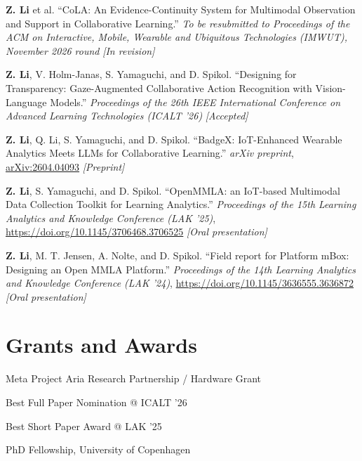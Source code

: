 \documentclass[11pt,letterpaper]{report}
\begin{document}
    \begin{tablist}
        \item[2026] \tab{} \textbf{Z. Li} et al. \enquote{CoLA: An Evidence-Continuity System for Multimodal Observation and Support in Collaborative Learning.} \textit{To be resubmitted to Proceedings of the ACM on Interactive, Mobile, Wearable and Ubiquitous Technologies (IMWUT), November 2026 round} \textit{[In revision]}
        \item[2026] \tab{} \textbf{Z. Li}, V. Holm-Janas, S. Yamaguchi, and D. Spikol. \enquote{Designing for Transparency: Gaze-Augmented Collaborative Action Recognition with Vision-Language Models.} \textit{Proceedings of the 26th IEEE International Conference on Advanced Learning Technologies (ICALT '26)} \textit{[Accepted]}
        \item[2026] \tab{} \textbf{Z. Li}, Q. Li, S. Yamaguchi, and D. Spikol. \enquote{BadgeX: IoT-Enhanced Wearable Analytics Meets LLMs for Collaborative Learning.} \textit{arXiv preprint}, \href{https://arxiv.org/abs/2604.04093}{arXiv:2604.04093} \textit{[Preprint]}
        \item[2025] \tab{} \textbf{Z. Li}, S. Yamaguchi, and D. Spikol. \enquote{OpenMMLA: an IoT-based Multimodal Data Collection Toolkit for Learning Analytics.} \textit{Proceedings of the 15th Learning Analytics and Knowledge Conference (LAK '25)}, \href{https://doi.org/10.1145/3706468.3706525}{https://doi.org/10.1145/3706468.3706525} \textit{[Oral presentation]}
        \item[2024] \tab{} \textbf{Z. Li}, M. T. Jensen, A. Nolte, and D. Spikol. \enquote{Field report for Platform mBox: Designing an Open MMLA Platform.} \textit{Proceedings of the 14th Learning Analytics and Knowledge Conference (LAK '24)}, \href{https://doi.org/10.1145/3636555.3636872}{https://doi.org/10.1145/3636555.3636872} \textit{[Oral presentation]}
    \end{tablist}


    \section*{Grants and Awards}

    \begin{tablist}
        \item[2026\phantom{--2027}] \tab{}Meta Project Aria Research Partnership / Hardware Grant
        \item[2026\phantom{--2027}] \tab{}Best Full Paper Nomination @ ICALT '26
        \item[2025\phantom{--2027}] \tab{}Best Short Paper Award @ LAK '25
        \item[2024--2027] \tab{}PhD Fellowship, University of Copenhagen
    \end{tablist}
\end{document}
